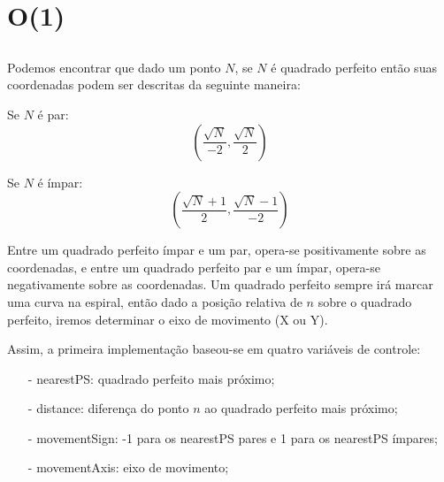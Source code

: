 \documentclass[12pt,a4paper]{article}
\begin{document}
        
    	

\section{O(1)}
    \subsection{}
        Podemos encontrar que dado um ponto $N$, se $N$ é quadrado perfeito então suas coordenadas podem ser descritas da seguinte maneira: 
        
        Se $N$ é par:
        $$(\frac{\sqrt{N}}{-2}, \frac{\sqrt{N}}{2})$$
        
        Se $N$ é ímpar:
        $$(\frac{\sqrt{N} + 1}{2}, \frac{\sqrt{N} - 1}{-2})$$
        
        Entre um quadrado perfeito ímpar e um par, opera-se positivamente sobre as coordenadas, e entre um quadrado perfeito par e um ímpar, opera-se negativamente sobre as coordenadas. Um quadrado perfeito sempre irá marcar uma curva na espiral, então dado a posição relativa de $n$ sobre o quadrado perfeito, iremos determinar o eixo de movimento (X ou Y).

        
        Assim, a primeira implementação baseou-se em quatro variáveis de controle:
        \begin{itemize}
        	\item[-] nearestPS: quadrado perfeito mais próximo;
        	\item[-] distance: diferença do ponto $n$ ao quadrado perfeito mais próximo;
        	\item[-] movementSign: -1 para os nearestPS pares e 1 para os nearestPS ímpares;
        	\item[-] movementAxis: eixo de movimento;
    	\end{itemize}
    	
\end{document}
